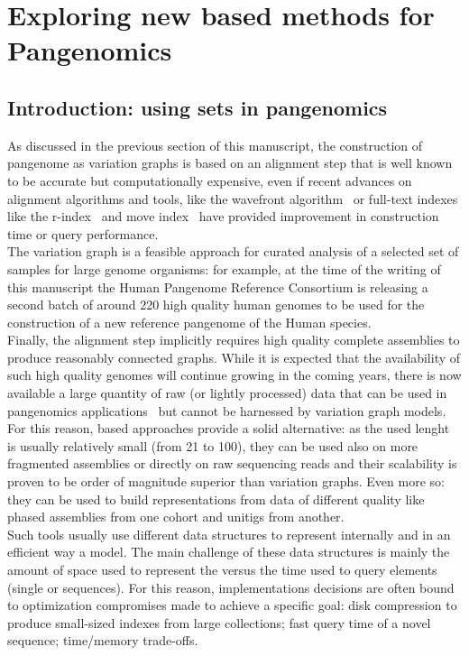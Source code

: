 \chapter{Exploring new \kmer based methods for Pangenomics} %
\label{sec:complexity}

\section{Introduction: using \kmer sets in pangenomics}%
As discussed in the previous section of this manuscript, the  construction of pangenome as variation graphs is based on an alignment step that is well known to be accurate but computationally expensive, even if recent advances on alignment algorithms and tools, like the wavefront algorithm~\cite{wavefront} or full-text indexes like the r-index~\cite{spumoni2} and move index~\cite{movi} have provided improvement in construction time or query performance.\\
The variation graph is a feasible approach for curated analysis of a selected set of samples for large genome organisms: for example, at the time of the writing of this manuscript the Human Pangenome Reference Consortium is releasing a second batch of around 220 high quality human genomes to be used for the construction of a new reference pangenome of the Human species.\\
Finally, the alignment step implicitly requires high quality complete assemblies to produce reasonably connected graphs. While it is expected that the availability of such high quality genomes will continue growing in the coming years, there is now available a large quantity of raw (or lightly processed) data that can be used in pangenomics applications~\cite{serratus,logan} but cannot be harnessed by variation graph models.\\ 
For this reason, \kmer based approaches provide a solid alternative: as the used \kmer lenght is usually relatively small (from 21 to 100), they can be used also on more fragmented assemblies or directly on raw sequencing reads and their scalability is proven to be order of magnitude superior than variation graphs. Even more so: they can be used to build representations from data of different quality like phased assemblies from one cohort and unitigs from another.\\
Such tools usually use different data structures to represent internally and in an efficient way a \dbg model. The main challenge of these data structures is mainly the amount of space used to represent the \kmers versus the time used to query elements (single \kmers or sequences). For this reason, implementations decisions are often bound to optimization compromises made to achieve a specific goal: disk compression to produce small-sized indexes from large collections; fast query time of a novel sequence; time/memory trade-offs.
